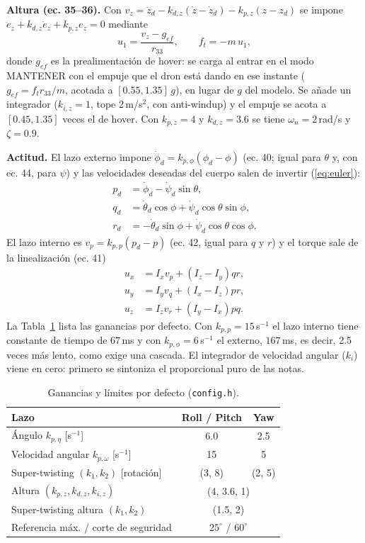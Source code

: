 \textbf{Altura (ec. 35--36).} Con $v_z=\ddot z_d-k_{d,z}(\dot z-\dot z_d)-k_{p,z}(z-z_d)$ se impone $\ddot e_z+k_{d,z}\dot e_z+k_{p,z}e_z=0$ mediante
\begin{equation}
u_1=\frac{v_z-g_{ef}}{r_{33}},\qquad f_t=-m\,u_1,
\label{eq:altura}
\end{equation}
donde $g_{ef}$ es la prealimentación de hover: se carga al entrar en el modo MANTENER con el empuje que el dron está dando en ese instante ($g_{ef}=f_t r_{33}/m$, acotada a $[0.55,1.35]\,g$), en lugar de $g$ del modelo. Se añade un integrador ($k_{i,z}=1$, tope 2\,m/s$^2$, con anti-windup) y el empuje se acota a $[0.45,1.35]$ veces el de hover. Con $k_{p,z}=4$ y $k_{d,z}=3.6$ se tiene $\omega_n=2$\,rad/s y $\zeta=0.9$.

\textbf{Actitud.} El lazo externo impone $\dot\phi_d=k_{p,\phi}(\phi_d-\phi)$ (ec. 40; igual para $\theta$ y, con ec. 44, para $\psi$) y las velocidades deseadas del cuerpo salen de invertir (\ref{eq:euler}):
\begin{align}
p_d&=\dot\phi_d-\dot\psi_d\sin\theta,\nonumber\\
q_d&=\dot\theta_d\cos\phi+\dot\psi_d\cos\theta\sin\phi,\label{eq:inv}\\
r_d&=-\dot\theta_d\sin\phi+\dot\psi_d\cos\theta\cos\phi.\nonumber
\end{align}
El lazo interno es $v_p=k_{p,p}(p_d-p)$ (ec. 42, igual para $q$ y $r$) y el torque sale de la linealización (ec. 41)
\begin{align}
u_x&=I_xv_p+(I_z-I_y)qr,\nonumber\\
u_y&=I_yv_q+(I_x-I_z)pr,\label{eq:lin}\\
u_z&=I_zv_r+(I_y-I_x)pq.\nonumber
\end{align}
La Tabla~\ref{tab:gan} lista las ganancias por defecto. Con $k_{p,p}=15$\,s$^{-1}$ el lazo interno tiene constante de tiempo de $67$\,ms y con $k_{p,\phi}=6$\,s$^{-1}$ el externo, $167$\,ms, es decir, 2.5 veces más lento, como exige una cascada. El integrador de velocidad angular ($k_i$) viene en cero: primero se sintoniza el proporcional puro de las notas.

\begin{table}[t]
\caption{Ganancias y límites por defecto (\texttt{config.h}).}
\label{tab:gan}
\centering\small
\begin{tabular}{@{}lcc@{}}
\toprule
Lazo & Roll / Pitch & Yaw \\
\midrule
Ángulo $k_{p,\eta}$ [s$^{-1}$] & 6.0 & 2.5 \\
Velocidad angular $k_{p,\omega}$ [s$^{-1}$] & 15 & 5 \\
Super-twisting $(k_1,k_2)$ [rotación] & (3, 8) & (2, 5) \\
Altura $(k_{p,z},k_{d,z},k_{i,z})$ & \multicolumn{2}{c}{(4, 3.6, 1)} \\
Super-twisting altura $(k_1,k_2)$ & \multicolumn{2}{c}{(1.5, 2)} \\
Referencia máx. / corte de seguridad & \multicolumn{2}{c}{$25^\circ$ / $60^\circ$} \\
\bottomrule
\end{tabular}
\end{table}


